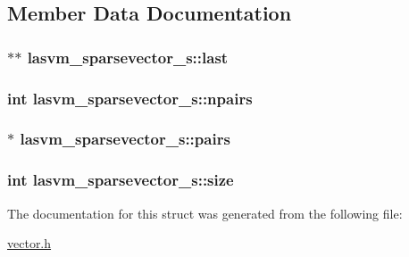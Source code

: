 \subsection{Member Data Documentation}
\hypertarget{structlasvm__sparsevector__s_ae687376f86369e6aa856e15de71926d9}{
\subsubsection[{last}]{$\ast$$\ast$ lasvm\+\_\+sparsevector\+\_\+s\+::last}}\label{structlasvm__sparsevector__s_ae687376f86369e6aa856e15de71926d9}
\hypertarget{structlasvm__sparsevector__s_a2b70154481bf0a7211021f22ee9db98f}{
\subsubsection[{npairs}]{\setlength{\rightskip}{0pt plus 5cm}int lasvm\+\_\+sparsevector\+\_\+s\+::npairs}}\label{structlasvm__sparsevector__s_a2b70154481bf0a7211021f22ee9db98f}
\hypertarget{structlasvm__sparsevector__s_aff1ec2417fad6c9f9debe6584de2fe2a}{
\subsubsection[{pairs}]{$\ast$ lasvm\+\_\+sparsevector\+\_\+s\+::pairs}}\label{structlasvm__sparsevector__s_aff1ec2417fad6c9f9debe6584de2fe2a}
\hypertarget{structlasvm__sparsevector__s_a633b9e044c4ff9224d90da03fde45aa2}{
\subsubsection[{size}]{\setlength{\rightskip}{0pt plus 5cm}int lasvm\+\_\+sparsevector\+\_\+s\+::size}}\label{structlasvm__sparsevector__s_a633b9e044c4ff9224d90da03fde45aa2}


The documentation for this struct was generated from the following file\+:\begin{DoxyCompactItemize}
\item 
\hyperlink{vector_8h}{vector.\+h}\end{DoxyCompactItemize}

